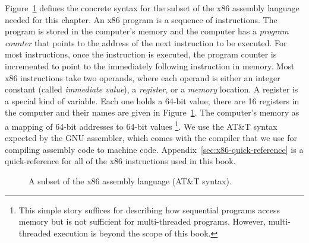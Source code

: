 \documentclass[11pt]{book}
\begin{document}
Figure~\ref{fig:x86-a} defines the concrete syntax for the subset of
the x86 assembly language needed for this chapter.
%
An x86 program is a sequence of instructions. The program is stored in
the computer's memory and the computer has a \emph{program counter}
that points to the address of the next instruction to be executed. For
most instructions, once the instruction is executed, the program
counter is incremented to point to the immediately following
instruction in memory. Most x86 instructions take two operands, where
each operand is either an integer constant (called \emph{immediate
  value}), a \emph{register}, or a \emph{memory} location.  A register
is a special kind of variable. Each one holds a 64-bit value; there
are 16 registers in the computer and their names are given in
Figure~\ref{fig:x86-a}. The computer's memory as a mapping of 64-bit
addresses to 64-bit values%
\footnote{This simple story suffices for describing how sequential
  programs access memory but is not sufficient for multi-threaded
  programs. However, multi-threaded execution is beyond the scope of
  this book.}.
%
We use the AT\&T syntax expected by the GNU assembler, which comes
with the  compiler that we use for compiling assembly code to
machine code.
%
Appendix~\ref{sec:x86-quick-reference} is a quick-reference for all of
the x86 instructions used in this book.



\newcommand{\allregisters}{\key{rsp} \mid \key{rbp} \mid \key{rax} \mid \key{rbx} \mid \key{rcx}
              \mid \key{rdx} \mid \key{rsi} \mid \key{rdi} \mid \\
              && \key{r8} \mid \key{r9} \mid \key{r10}
              \mid \key{r11} \mid \key{r12} \mid \key{r13}
              \mid \key{r14} \mid \key{r15}}

\begin{figure}[tp]
\fbox{
\begin{minipage}{0.96\textwidth}
\[
\begin{array}{lcl}
\Reg &::=& \allregisters{} \\
\Arg &::=&  \key{\$}\Int \mid \key{\%}\Reg \mid \Int\key{(}\key{\%}\Reg\key{)}\\
\Instr &::=& \key{addq} \; \Arg\key{,} \Arg \mid
      \key{subq} \; \Arg\key{,} \Arg \mid
      \key{negq} \; \Arg \mid \key{movq} \; \Arg\key{,} \Arg \mid \\
  &&  \key{callq} \; \mathit{label} \mid
      \key{pushq}\;\Arg \mid \key{popq}\;\Arg \mid \key{retq} \mid \itm{label}\key{:}\; \Instr \\
\Prog &::= & \key{.globl main}\\
      &    & \key{main:} \; \Instr^{+}
\end{array}
\]
\end{minipage}
}
\caption{A subset of the x86 assembly language (AT\&T syntax).}
\label{fig:x86-a}
\end{figure}
\end{document}
